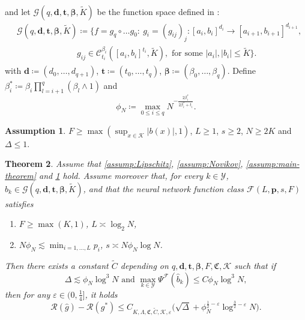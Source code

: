 \documentclass{article}
\theoremstyle{plain}
\newtheorem{theorem}{Theorem}[section]
\theoremstyle{definition}
\newtheorem{assumption}[theorem]{Assumption}
\theoremstyle{remark}
\newcommand{\calY}{\mathcal{Y}}
\newcommand{\calF}{\mathcal{F}}
\newcommand{\calR}{\mathcal{R}}
\newcommand{\nnset}{\mathcal{F}(L, \mathbf{p}, s, F)}
\begin{document}
and let $\mathcal{G}(q,\mathbf{d}, \mathbf{t},\boldsymbol{\beta}, \widetilde{K})$ be the function space defined in \citet{SchmidtHieber2020}:
\begin{align}
&\mathcal{G}(q,\mathbf{d}, \mathbf{t},\boldsymbol{\beta}, \widetilde{K})\coloneqq \big\{ f=g_q\circ \dots g_0: \:  g_i=(g_{ij})_j:[a_i, b_i]^{d_i}\rightarrow [a_{i+1}, b_{i+1}]^{d_{i+1}}, \nonumber\\
&\hspace{3cm}  g_{ij}\in\mathcal{C}_{t_i}^{\beta_i}([a_i, b_i]^{t_i}, \widetilde{K}), \text{ for some }|a_i|, |b_i|\leq \widetilde{K}\big\}.\nonumber
\end{align}
with $\mathbf{d}\coloneqq (d_0, \dots, d_{q+1})$, $\mathbf{t}\coloneqq(t_0, \dots, t_q)$, $\boldsymbol{\beta}\coloneqq (\beta_0,\dots, \beta_q)$.
Define $\beta_i^*\coloneqq \beta_i\prod_{l=i+1}^{q}(\beta_l\wedge 1)$ and 
\begin{equation}\label{eq:def-phi-N}
    \phi_{N}\coloneqq \max_{0\leq i \leq q}N^{-\frac{2\beta_i^*}{2\beta_{i}^*+t_i}}.
\end{equation}
\begin{assumption}
\label{assum:NN-parameter}
$F\geq \max(\sup_{x\in\mathcal{K}}|b(x)|,1)$, $L\geq1$, $s\geq2$, $N\geq2K$ and $\Delta \leq 1$. %
\end{assumption}
\begin{theorem}\label{thm:main-NN}
Assume that \ref{assump:Lipschitz}, \ref{assump:Novikov}, \ref{assump:main-theorem} and \ref{assum:NN-parameter} hold. Assume moreover that, for every $k\in\calY$, %
$b_k\in \mathcal{G}(q,\mathbf{d}, \mathbf{t},\boldsymbol{\beta}, \widetilde{K})$, %
and that the neural network function class  $\nnset$ satisfies 
\begin{enumerate}
    \item[$\mathrm{(i)}$] $F\geq \max(K,1)$, $L\asymp \log_2N$, %
    \item[$\mathrm{(ii)}$] $N\phi_N\lesssim \min_{i=1, ..., L}p_i$, $s\asymp N\phi_N \log N$.
\end{enumerate}
Then there exists a constant $\widetilde{C}$  depending  on $q, \mathbf{d}, \mathbf{t}, \boldsymbol{\beta}, F, \mathfrak{C}, \mathcal{K}$ such that if \[\Delta \lesssim \phi_N\log^3N \text{ and }\max_{k\in\calY}\Psi^{\calF}(\widehat b_k)\leq C \phi_N\log^3N,\] then for any $\varepsilon\in(0,\frac{1}{4}]$, it holds %
\begin{equation}
    \calR(\widehat{g})-\mathcal{R}(g^*)\leq C_{K,\Lambda, \mathfrak{C}, \widetilde{C},\mathcal{K}, \varepsilon}\Big(\sqrt{\Delta} + \phi_N^{\frac{1}{2}-\varepsilon} \log^{\frac{3}{2}-
\varepsilon} N\Big).\nonumber
\end{equation}
\end{theorem}
\end{document}
